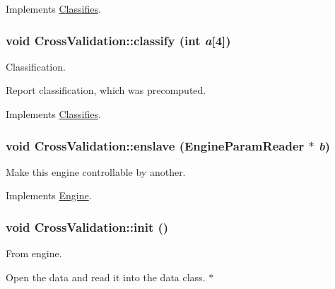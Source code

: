 Implements \hyperlink{classClassifies_a7d2ae89f04af1a74eb6dd35be8eda476}{Classifies}.

\hypertarget{classCrossValidation_a6b26e9c496dac46fb066fae0f381fed0}{
\subsubsection[{classify}]{\setlength{\rightskip}{0pt plus 5cm}void CrossValidation::classify (int {\em a}\mbox{[}4\mbox{]})}}
\label{classCrossValidation_a6b26e9c496dac46fb066fae0f381fed0}


Classification. 

Report classification, which was precomputed. 

Implements \hyperlink{classClassifies_a15864d3a95edfde2bf48384c9b25c6d8}{Classifies}.

\hypertarget{classCrossValidation_a50b65a606c324404de92f44dba655154}{
\subsubsection[{enslave}]{\setlength{\rightskip}{0pt plus 5cm}void CrossValidation::enslave ({\bf EngineParamReader} $\ast$ {\em b})}}
\label{classCrossValidation_a50b65a606c324404de92f44dba655154}
Make this engine controllable by another. 

Implements \hyperlink{classEngine_a023e094182312b1732fe53754c2fe5cb}{Engine}.

\hypertarget{classCrossValidation_acf88bf85dec8d27f6aa97d9ec04ccf26}{
\subsubsection[{init}]{\setlength{\rightskip}{0pt plus 5cm}void CrossValidation::init ()}}
\label{classCrossValidation_acf88bf85dec8d27f6aa97d9ec04ccf26}


From engine. 

Open the data and read it into the data class. $\ast$ 

